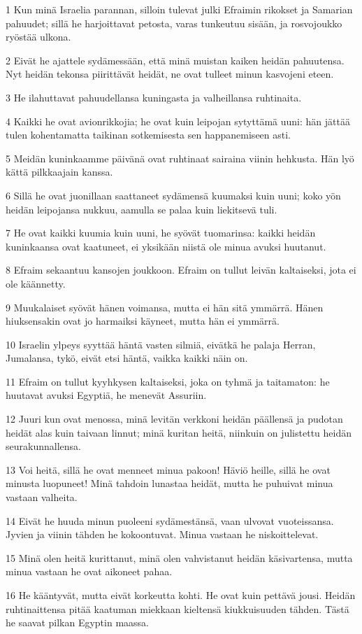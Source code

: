 \par 1 Kun minä Israelia parannan, silloin tulevat julki Efraimin rikokset ja Samarian pahuudet; sillä he harjoittavat petosta, varas tunkeutuu sisään, ja rosvojoukko ryöstää ulkona.
\par 2 Eivät he ajattele sydämessään, että minä muistan kaiken heidän pahuutensa. Nyt heidän tekonsa piirittävät heidät, ne ovat tulleet minun kasvojeni eteen.
\par 3 He ilahuttavat pahuudellansa kuningasta ja valheillansa ruhtinaita.
\par 4 Kaikki he ovat avionrikkojia; he ovat kuin leipojan sytyttämä uuni: hän jättää tulen kohentamatta taikinan sotkemisesta sen happanemiseen asti.
\par 5 Meidän kuninkaamme päivänä ovat ruhtinaat sairaina viinin hehkusta. Hän lyö kättä pilkkaajain kanssa.
\par 6 Sillä he ovat juonillaan saattaneet sydämensä kuumaksi kuin uuni; koko yön heidän leipojansa nukkuu, aamulla se palaa kuin liekitsevä tuli.
\par 7 He ovat kaikki kuumia kuin uuni, he syövät tuomarinsa: kaikki heidän kuninkaansa ovat kaatuneet, ei yksikään niistä ole minua avuksi huutanut.
\par 8 Efraim sekaantuu kansojen joukkoon. Efraim on tullut leivän kaltaiseksi, jota ei ole käännetty.
\par 9 Muukalaiset syövät hänen voimansa, mutta ei hän sitä ymmärrä. Hänen hiuksensakin ovat jo harmaiksi käyneet, mutta hän ei ymmärrä.
\par 10 Israelin ylpeys syyttää häntä vasten silmiä, eivätkä he palaja Herran, Jumalansa, tykö, eivät etsi häntä, vaikka kaikki näin on.
\par 11 Efraim on tullut kyyhkysen kaltaiseksi, joka on tyhmä ja taitamaton: he huutavat avuksi Egyptiä, he menevät Assuriin.
\par 12 Juuri kun ovat menossa, minä levitän verkkoni heidän päällensä ja pudotan heidät alas kuin taivaan linnut; minä kuritan heitä, niinkuin on julistettu heidän seurakunnallensa.
\par 13 Voi heitä, sillä he ovat menneet minua pakoon! Häviö heille, sillä he ovat minusta luopuneet! Minä tahdoin lunastaa heidät, mutta he puhuivat minua vastaan valheita.
\par 14 Eivät he huuda minun puoleeni sydämestänsä, vaan ulvovat vuoteissansa. Jyvien ja viinin tähden he kokoontuvat. Minua vastaan he niskoittelevat.
\par 15 Minä olen heitä kurittanut, minä olen vahvistanut heidän käsivartensa, mutta minua vastaan he ovat aikoneet pahaa.
\par 16 He kääntyvät, mutta eivät korkeutta kohti. He ovat kuin pettävä jousi. Heidän ruhtinaittensa pitää kaatuman miekkaan kieltensä kiukkuisuuden tähden. Tästä he saavat pilkan Egyptin maassa.

